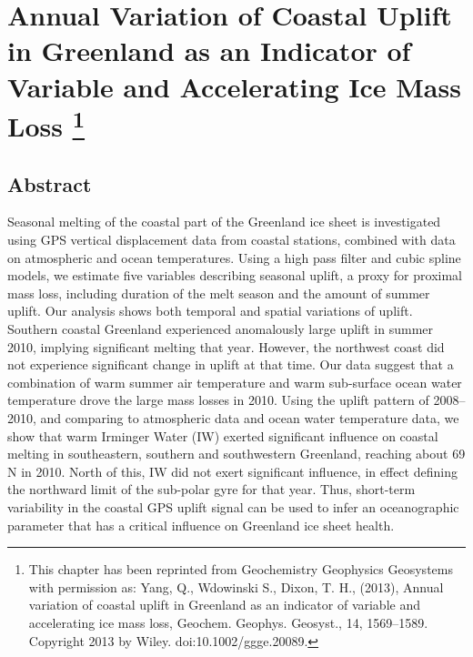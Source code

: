 \chapter[Annual Variation of Coastal Uplift in Greenland as an Indicator of Variable and Accelerating Ice Mass Loss]{Annual Variation of Coastal Uplift in Greenland as an Indicator of Variable and Accelerating Ice Mass Loss \footnote{This chapter has been reprinted from Geochemistry Geophysics Geosystems with permission as: Yang, Q., Wdowinski S., Dixon, T. H., (2013), Annual variation of coastal uplift in Greenland as an indicator of variable and accelerating ice mass loss, Geochem. Geophys. Geosyst., 14, 1569–1589. Copyright 2013 by Wiley. doi:10.1002/ggge.20089.}}

\section{Abstract} 
Seasonal melting of the coastal part of the Greenland ice sheet is investigated using GPS vertical displacement data from coastal stations, combined with data on atmospheric and ocean temperatures.
Using a high pass filter and cubic spline models, we estimate five variables describing seasonal uplift, a proxy for proximal mass loss, including duration of the melt season and the amount of summer uplift. Our analysis shows both temporal and spatial variations of uplift. Southern coastal Greenland experienced
anomalously large uplift in summer 2010, implying significant melting that year. However, the northwest coast did not experience significant change in uplift at that time. Our data suggest that a combination of warm summer air temperature and warm sub-surface ocean water temperature drove the large mass losses in 2010. Using the uplift pattern of 2008–2010, and comparing to atmospheric data and ocean water temperature data, we show that warm Irminger Water (IW) exerted significant influence on coastal melting in southeastern, southern and southwestern Greenland, reaching about 69 \textordmasculine N in 2010. North of this, IW did not exert significant influence, in effect defining the northward limit of the sub-polar gyre for that year. Thus, short-term variability in the coastal GPS uplift signal can be used to infer an oceanographic parameter that has a critical influence on Greenland ice sheet health.

